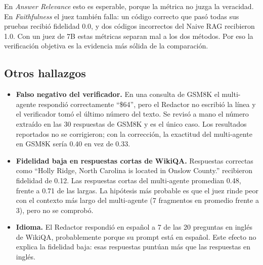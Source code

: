 En \emph{Answer Relevance} esto es esperable, porque la métrica no juzga la veracidad.
En \emph{Faithfulness} el juez también falla: un código correcto que pasó todas sus pruebas recibió fidelidad 0.0, y dos códigos incorrectos del Naive RAG recibieron 1.0.
Con un juez de 7B estas métricas separan mal a los dos métodos.
Por eso la verificación objetiva es la evidencia más sólida de la comparación.

\subsection{Otros hallazgos}

\begin{itemize}
  \item \textbf{Falso negativo del verificador.} En una consulta de GSM8K el multi-agente respondió correctamente ``\$64'', pero el Redactor no escribió la línea  y el verificador tomó el último número del texto.
  Se revisó a mano el número extraído en las 30 respuestas de GSM8K y es el único caso.
  Los resultados reportados no se corrigieron; con la corrección, la exactitud del multi-agente en GSM8K sería 0.40 en vez de 0.33.
  \item \textbf{Fidelidad baja en respuestas cortas de WikiQA.} Respuestas correctas como ``Holly Ridge, North Carolina is located in Onslow County.'' recibieron fidelidad de 0.12.
  Las respuestas cortas del multi-agente promedian 0.48, frente a 0.71 de las largas.
  La hipótesis más probable es que el juez rinde peor con el contexto más largo del multi-agente (7 fragmentos en promedio frente a 3), pero no se comprobó.
  \item \textbf{Idioma.} El Redactor respondió en español a 7 de las 20 preguntas en inglés de WikiQA, probablemente porque su prompt está en español.
  Este efecto no explica la fidelidad baja: esas respuestas puntúan más que las respuestas en inglés.
\end{itemize}
